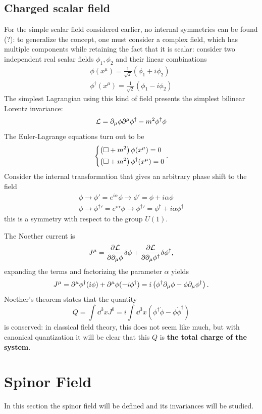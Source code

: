 \subsection{Charged scalar field}
For the simple scalar field considered earlier, no internal symmetries can be
found (?): to generalize the concept, one must consider a complex field, which has
multiple components while retaining the fact that it is scalar:
consider two independent real scalar fields $\phi_1,\phi_2$ and their linear
combinations
\begin{gather*}
\phi(x^\mu) = \frac{1}{\sqrt{2}}\left(\phi_1+i\phi_2\right)\\
\phi^\dagger(x^\mu) = \frac{1}{\sqrt{2}}\left(\phi_1-i\phi_2\right)
\end{gather*}
The simplest Lagrangian using this kind of field presents the simplest bilinear
Lorentz invariance:
$$\mathcal{L}=\partial_\mu\phi\partial^\mu\phi^\dagger - m^2\phi^\dagger\phi$$
The Euler-Lagrange equations turn out to be
$$\begin{dcases*}
  \left(\Box + m^2\right)\phi(x^\mu) = 0\\
  \left(\Box + m^2\right)\phi^\dagger(x^\mu) = 0
\end{dcases*}.$$
Consider the internal transformation that gives an arbitrary phase shift to the field
\begin{gather*}
\phi \rightarrow \phi'=e^{i\alpha}\phi\rightarrow \phi'=\phi+i\alpha\phi\\
\phi\rightarrow{\phi^\dagger}'=e^{i\alpha}\phi\rightarrow{\phi^\dagger}'=\phi^\dagger
+ i\alpha\phi^\dagger
\end{gather*}
this is a symmetry with respect to the group $U(1)$.

The Noether current is
$$J^\mu = \pdv[]{\mathcal{L}}{\partial_\mu\phi}\delta\phi + \pdv{\mathcal{L}}
{\partial_\mu\phi^\dagger}\delta\phi^\dagger,$$
expanding the terms and factorizing the parameter $\alpha$ yields
$$J^\mu = \partial^\mu\phi^\dagger(i\phi)+\partial^\mu\phi(-i\phi^\dagger) = 
i\left(\phi^\dagger\partial_\mu\phi - \phi\partial_\mu\phi^\dagger\right).$$
Noether's theorem states that the quantity
$$Q = \int_{}^{}\dd^3 x J^0 = i\int_{}^{}\dd^3x \left(\phi^\dagger\dot\phi-
\phi\dot\phi^\dagger\right)$$
is conserved: in classical field theory, this does not seem like much, but with
canonical quantization it will be clear that this $Q$ is \textbf{the total charge of
the system}.
\section{Spinor Field}
In this section the spinor field will be defined and its invariances will be studied.

